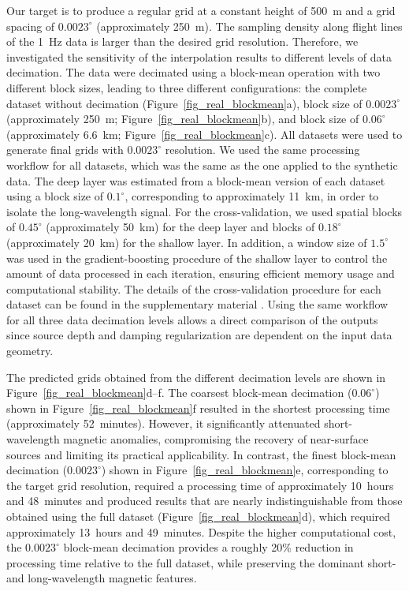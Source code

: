 \documentclass[onecolumn,10pt,a4paper]{article}
\begin{document}
Our target is to produce a regular grid at a constant height of 500~m and
a grid spacing of $0.0023^{\circ}$ (approximately 250~m).
The sampling density along flight lines of the 1~Hz data is larger than the
desired grid resolution.
Therefore, we investigated the sensitivity of the interpolation results to
different levels of data decimation.
The data were decimated using a block-mean operation with
two different block sizes, leading to three different configurations:
the complete dataset without decimation (Figure~\ref{fig_real_blockmean}a),
block size of $0.0023^{\circ}$ (approximately 250~m;
Figure~\ref{fig_real_blockmean}b), and
block size of $0.06^{\circ}$ (approximately 6.6~km; Figure~\ref{fig_real_blockmean}c). All
datasets were used to generate final grids with $0.0023^{\circ}$ resolution.
We used the same processing workflow for all datasets, which was the same as
the one applied to the synthetic data.
The deep layer was estimated from a block-mean version of each
dataset using a block size of $0.1^{\circ}$, corresponding to approximately
11~km, in order to isolate the long-wavelength signal.
For the cross-validation, we used
spatial blocks of $0.45^{\circ}$ (approximately 50~km) for the deep layer
and blocks of $0.18^{\circ}$ (approximately 20~km) for the shallow layer.
In addition, a window size of $1.5^{\circ}$ was used in the
gradient-boosting procedure of the shallow layer to control the amount of data
processed in each iteration, ensuring efficient memory usage and computational
stability.
The details of the cross-validation procedure for each dataset can be found in
the supplementary material \citep{archive}.
Using the same workflow for all three data decimation levels allows a direct
comparison of the outputs since source depth and damping regularization are
dependent on the input data geometry.

The predicted grids obtained from the different decimation
levels are shown in Figure~\ref{fig_real_blockmean}d--f.
The coarsest block-mean decimation ($0.06^{\circ}$) shown in
Figure~\ref{fig_real_blockmean}f resulted in the shortest
processing time (approximately 52~minutes).
However, it significantly attenuated short-wavelength magnetic anomalies,
compromising the recovery of near-surface sources and limiting its practical
applicability.
In contrast, the finest block-mean decimation ($0.0023^{\circ}$) shown in
Figure~\ref{fig_real_blockmean}e, corresponding to the target grid resolution,
required a processing time of approximately 10~hours and 48~minutes and
produced results that are nearly indistinguishable from those obtained using
the full dataset (Figure~\ref{fig_real_blockmean}d), which required
approximately 13~hours and 49~minutes.
Despite the higher computational cost, the $0.0023^{\circ}$ block-mean
decimation provides a roughly 20\% reduction in processing time relative to the
full dataset, while preserving the dominant short- and long-wavelength magnetic
features.
\end{document}
